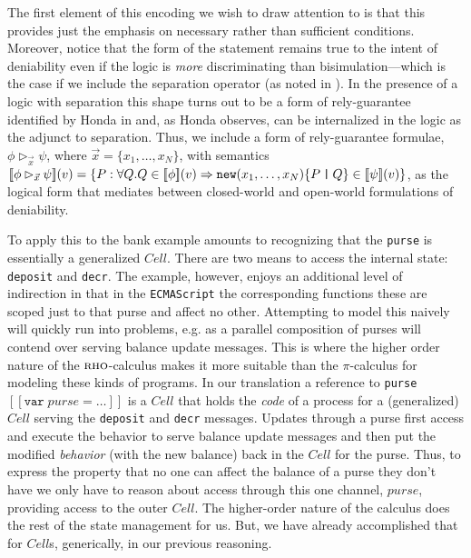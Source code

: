 \documentclass[]{acm_proc_article-sp}
\newcommand{\ldb}{[\![}
\newcommand{\rdb}{]\!]}
\newcommand{\id}[1]{\texttt{#1}}
\newcommand{\juxtap}{\mathbin{\id{|}}}
\newcommand{\binpar}[2]{#1 \juxtap #2}
\newcommand{\meaningof}[1]{\ldb #1 \rdb}
\newcommand{\pmeaningof}[1]{\ldb #1 \rdb}
\numberwithin{equation}{subsection}
\newcommand{\pic}{$\pi$-calculus}
\newcommand{\rhoc}{${\textsc{rho}}$-calculus}
\begin{document}
The first element of this encoding we wish to draw attention to is
that this provides just the emphasis on necessary rather than
sufficient conditions. Moreover, notice that the form of the statement
remains true to the intent of deniability even if the logic is
\emph{more} discriminating than bisimulation---which is the case if we
include the separation operator (as noted in
\cite{DBLP:conf/fossacs/Caires04}). In the presence of a logic with
separation this shape turns out to be a form of rely-guarantee
identified by Honda in \cite{Honda:2008:UTP:2227536.2227558} and, as
Honda observes, can be internalized in the logic as the adjunct to
separation. Thus, we include a form of rely-guarantee formulae, $\phi
\rhd_{\vec{x}} \psi$, where $\vec{x} = \{ x_1,\ldots,x_N\}$, with
semantics $\pmeaningof{\phi \rhd_{\vec{x}} \psi}( v ) = \{ P : \forall
Q. Q \in \pmeaningof{\phi}( v ) \Rightarrow
\mbox{\texttt{new}}(x_1,\ldots,x_N)\mbox{\{}\binpar{P}{Q}\mbox{\}}\in
\pmeaningof{\psi}(v) \}$, as the logical form that mediates between
closed-world and open-world formulations of deniability.

To apply this to the bank example amounts to recognizing that the
\texttt{purse} is essentially a generalized $Cell$. There are two
means to access the internal state: \texttt{deposit} and
\texttt{decr}. The example, however, enjoys an additional level of
indirection in that in the \texttt{ECMAScript} the corresponding
functions these are scoped just to that purse and affect no
other. Attempting to model this naively will quickly run into
problems, e.g.  as a parallel composition of purses will contend over
serving balance update messages. This is where the higher order nature
of the {\rhoc} makes it more suitable than the {\pic} for modeling
these kinds of programs. In our translation a reference to
\texttt{purse} $\meaningof{\texttt{var}\; purse = \ldots}$ is a $Cell$
that holds the \emph{code} of a process for a (generalized) $Cell$
serving the \texttt{deposit} and \texttt{decr} messages. Updates
through a purse first access and execute the behavior to serve balance
update messages and then put the modified \emph{behavior} (with the
new balance) back in the $Cell$ for the purse. Thus, to express the
property that no one can affect the balance of a purse they don't have
\cite{Drossopoulou:2013:NCP:2489804.2489811} we only have to reason
about access through this one channel, $purse$, providing access to
the outer $Cell$. The higher-order nature of the calculus does the
rest of the state management for us. But, we have already accomplished
that for $Cell$s, generically, in our previous reasoning.
\end{document}
